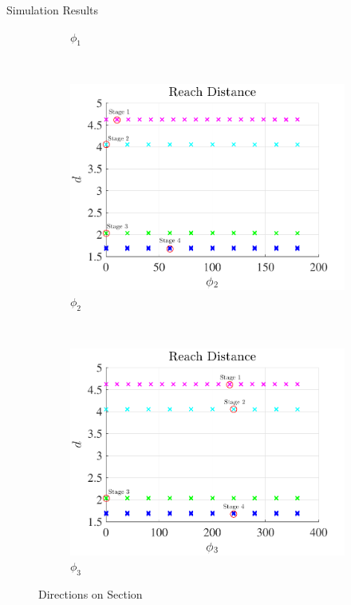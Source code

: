 \documentclass[final, usenames, dvipsnames]{beamer}
\newlength{\onecolwidth}
\begin{document}
\begin{frame}[t]
\begin{columns}[T,onlytextwidth]
\begin{column}{\onecolwidth}
\begin{block}{Simulation Results}
\begin{figure}[htbp]
\begin{subfigure}[htbp]{0.3\textwidth}
            \caption*{\(\phi_1\)}
        \end{subfigure}~ %
        \begin{subfigure}[htbp]{0.3\textwidth} 
            \includegraphics[width=\textwidth]{figures/phi2.pdf} 
            \caption*{\(\phi_2\)} 
        \end{subfigure}~ %
        \begin{subfigure}[htbp]{0.3\textwidth} 
            \includegraphics[width=\textwidth]{figures/phi3.pdf} 
            \caption*{\(\phi_3\)} 
        \end{subfigure} 
        \caption*{Directions on \Poincare Section}
        

\end{figure}
\end{block}
\end{column}
\end{columns}
\end{frame}
\end{document}
